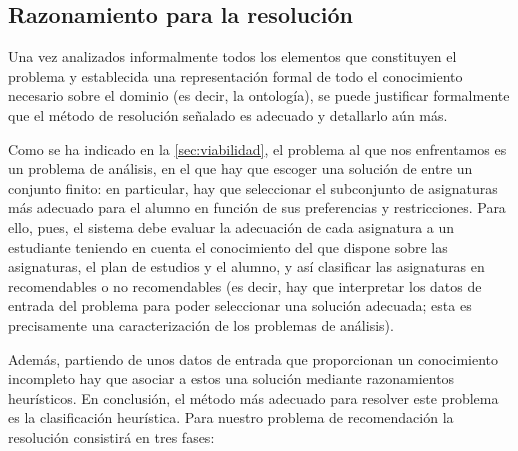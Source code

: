 
\subsection{Razonamiento para la resolución} \label{sec:razonamiento}

Una vez analizados informalmente todos los elementos que constituyen el 
problema y establecida una representación formal de todo el conocimiento 
necesario sobre el dominio (es decir, la ontología), se puede justificar 
formalmente que el método de resolución señalado es adecuado y detallarlo 
aún más.

Como se ha indicado en la \autoref{sec:viabilidad}, el problema al que nos 
enfrentamos es un problema de análisis, en el que hay que escoger una solución
de entre un conjunto finito: en particular, hay que seleccionar el subconjunto 
de asignaturas más adecuado para el alumno en función de sus preferencias y 
restricciones. Para ello, pues, el sistema debe evaluar la adecuación de 
cada asignatura a un estudiante teniendo en cuenta el conocimiento del que 
dispone sobre las asignaturas, el plan de estudios y el alumno, y así 
clasificar las asignaturas en recomendables o no recomendables (es decir, hay 
que interpretar los datos de entrada del problema para poder seleccionar una 
solución adecuada; esta es precisamente una caracterización de los problemas 
de análisis).

Además, partiendo de unos datos de entrada que proporcionan un conocimiento 
incompleto hay que asociar a estos una solución mediante razonamientos 
heurísticos. En conclusión, el método más adecuado para resolver este problema 
es la clasificación heurística. Para nuestro problema de recomendación la 
resolución consistirá en tres fases:

